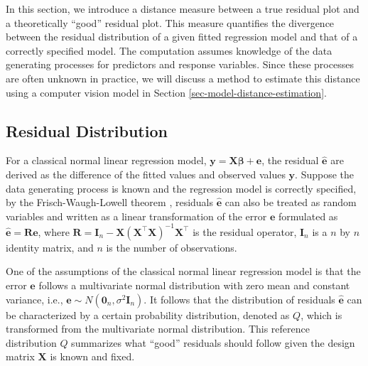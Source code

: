 \documentclass[]{interact}
\theoremstyle{plain}%
\theoremstyle{definition}
\theoremstyle{remark}
\begin{document}
In this section, we introduce a distance measure between a true residual
plot and a theoretically ``good'' residual plot. This measure quantifies
the divergence between the residual distribution of a given fitted
regression model and that of a correctly specified model. The
computation assumes knowledge of the data generating processes for
predictors and response variables. Since these processes are often
unknown in practice, we will discuss a method to estimate this distance
using a computer vision model in Section
\ref{sec-model-distance-estimation}.

\subsection{Residual Distribution}\label{residual-distribution}

For a classical normal linear regression model,
\(\boldsymbol{y} = \boldsymbol{X}\boldsymbol{\beta} + \boldsymbol{e}\),
the residual \(\hat{\boldsymbol{e}}\) are derived as the difference of
the fitted values and observed values \(\boldsymbol{y}\). Suppose the
data generating process is known and the regression model is correctly
specified, by the Frisch-Waugh-Lowell theorem \citep{frisch1933partial},
residuals \(\hat{\boldsymbol{e}}\) can also be treated as random
variables and written as a linear transformation of the error
\(\boldsymbol{e}\) formulated as
\(\hat{\boldsymbol{e}} = \boldsymbol{R}\boldsymbol{e}\), where
\(\boldsymbol{R}=\boldsymbol{I}_n -\boldsymbol{X}(\boldsymbol{X}^\top\boldsymbol{X})^{-1}\boldsymbol{X}^\top\)
is the residual operator, \(\boldsymbol{I}_n\) is a \(n\) by \(n\)
identity matrix, and \(n\) is the number of observations.

One of the assumptions of the classical normal linear regression model
is that the error \(\boldsymbol{e}\) follows a multivariate normal
distribution with zero mean and constant variance, i.e.,
\(\boldsymbol{e} \sim N(\boldsymbol{0}_n,\sigma^2\boldsymbol{I}_n)\). It
follows that the distribution of residuals \(\hat{\boldsymbol{e}}\) can
be characterized by a certain probability distribution, denoted as
\(Q\), which is transformed from the multivariate normal distribution.
This reference distribution \(Q\) summarizes what ``good'' residuals
should follow given the design matrix \(\boldsymbol{X}\) is known and
fixed.
\end{document}
